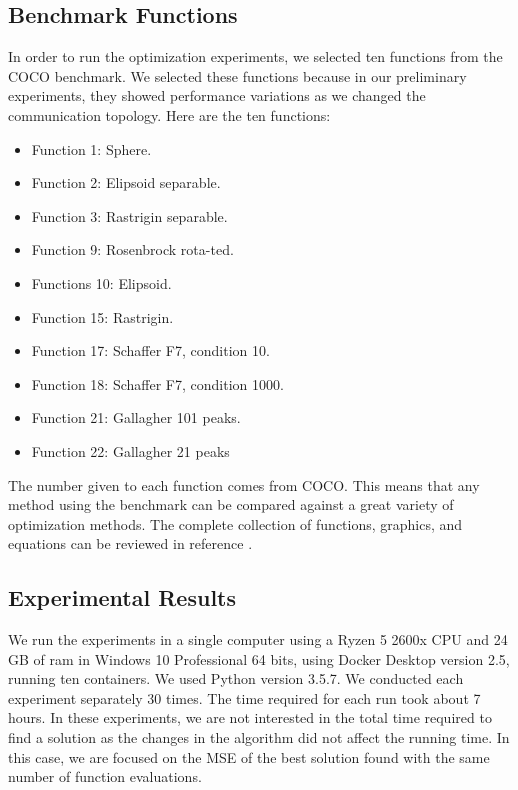 \documentclass[runningheads]{llncs}
\begin{document}
\subsection{Benchmark Functions}

In order to run the optimization experiments, we selected ten functions from the
COCO benchmark. We selected these functions because in our preliminary
experiments, they showed performance variations as we changed the communication
topology. Here are the ten functions:

\begin{multicols}{2}
\begin{itemize}

    \item Function 1: Sphere.
    \item Function 2: Elipsoid separable.
    \item Function 3: Rastrigin separable.
    \item Function 9: Rosenbrock rota-ted.
    \item Functions 10: Elipsoid.
    \item Function 15: Rastrigin.
    \item Function 17: Schaffer F7, condition 10.
    \item Function 18: Schaffer F7, condition 1000.
    \item Function 21: Gallagher 101 peaks.
    \item Function 22: Gallagher 21 peaks

\end{itemize}
\end{multicols}

The number given to each function comes from COCO. This means that any method
using the benchmark can be compared against a great variety of optimization
methods. The complete collection of functions, graphics, and equations can be
reviewed in reference \cite{bbob}.


\subsection{Experimental Results}

We run the experiments in a single computer using a Ryzen 5 2600x CPU and 24 GB
of ram in Windows 10 Professional 64 bits, using Docker Desktop version 2.5,
running ten containers. We used Python version 3.5.7. We conducted each
experiment separately 30 times. The time required for each run took about 7
hours. In these experiments, we are not interested in the total time required to
find a solution as the changes in the algorithm did not affect the running time.
In this case, we are focused on the MSE of the best solution found with the same
number of function evaluations.
\end{document}
